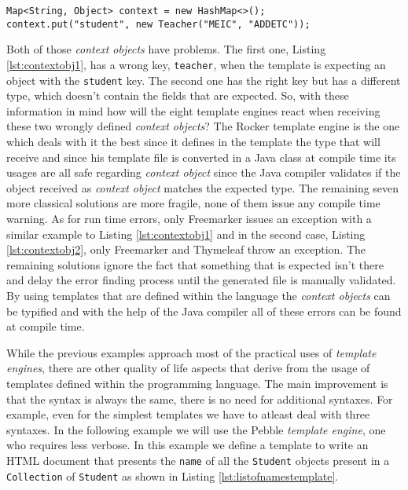 \bigskip


\begin{minipage}{\linewidth}
\begin{lstlisting}[caption={Context Object With Errors - 2}, label={lst:contextobj2}]
Map<String, Object> context = new HashMap<>();
context.put("student", new Teacher("MEIC", "ADDETC"));
\end{lstlisting}
\end{minipage} 

\noindent
Both of those \textit{context objects} have problems. The first one, Listing \ref{lst:contextobj1}, has a wrong key, \texttt{teacher}, when the template is expecting an object with the \texttt{student} key. The second one has the right key but has a different type, which doesn't contain the fields that are expected. So, with these information in mind how will the eight template engines react when receiving these two wrongly defined \textit{context objects}? The Rocker template engine is the one which deals with it the best since it defines in the template the type that will receive and since his template file is converted in a Java class at compile time its usages are all safe regarding \textit{context object} since the Java compiler validates if the object received as \textit{context object} matches the expected type. The remaining seven more classical solutions are more fragile, none of them issue any compile time warning. As for run time errors, only Freemarker issues an exception with a similar example to Listing \ref{lst:contextobj1} and in the second case, Listing \ref{lst:contextobj2}, only Freemarker and Thymeleaf throw an exception. The remaining solutions ignore the fact that something that is expected isn't there and delay the error finding process until the generated file is manually validated. By using templates that are defined within the language the \textit{context objects} can be typified and with the help of the Java compiler all of these errors can be found at compile time.

\noindent
While the previous examples approach most of the practical uses of \textit{template engines}, there are other quality of life aspects that derive from the usage of templates defined within the programming language. The main improvement is that the syntax is always the same, there is no need for additional syntaxes. For example, even for the simplest templates we have to atleast deal with three syntaxes. In the following example we will use the Pebble \textit{template engine}, one who requires less verbose. In this example we define a template to write an \ac{HTML} document that presents the \texttt{name} of all the \texttt{Student} objects present in a \texttt{Collection} of \texttt{Student} as shown in Listing \ref{lst:listofnamestemplate}.

